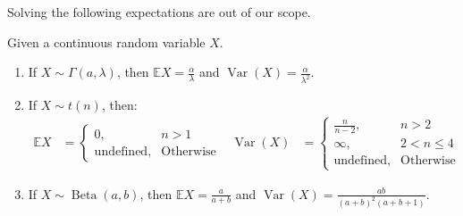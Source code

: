 \documentclass{huhtakm-template-book}
\newcommand{\expect}{\mathbb{E}}
\DeclareMathOperator{\Beta}{Beta}
\DeclareMathOperator{\Var}{Var}
\begin{document}
Solving the following expectations are out of our scope.
\begin{thm}
	Given a continuous random variable $X$.
	\begin{enumerate}
		\item If $X\sim\Gamma(a,\lambda)$, then $\expect{X}=\frac{\alpha}{\lambda}$ and $\Var(X)=\frac{\alpha}{\lambda^{2}}$.
		\item If $X\sim t(n)$, then:
		\begin{align*}
			\expect{X}&=\begin{cases}
				0, &n>1\\
				\text{undefined}, &\text{Otherwise}
			\end{cases} & \Var(X)&=\begin{cases}
				\frac{n}{n-2}, &n>2\\
				\infty, & 2<n\leq 4\\
				\text{undefined}, &\text{Otherwise}
			\end{cases}
		\end{align*}
		\item If $X\sim\Beta(a,b)$, then $\expect{X}=\frac{a}{a+b}$ and $\Var(X)=\frac{ab}{(a+b)^{2}(a+b+1)}$.
	\end{enumerate}
\end{thm}
\end{document}
